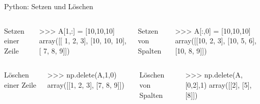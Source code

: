 \documentclass[hyperref={xetex}]{beamer}
\begin{document}
%
%
\begin{frame}[fragile]{Python: Setzen und Löschen}
\begin{columns}[c]%
%
\end{columns}%
\begin{columns}[t]
%
Setzen einer Zeile
\begin{pyin}
>>> A[1,:] = [10,10,10]
array([[ 1,  2,  3],
       [10, 10, 10],
       [ 7,  8,  9]])
\end{pyin}
%
Setzen von Spalten
\begin{pyin}
>>> A[:,0] = [10,10,10]
array([[10,  2,  3],
       [10,  5,  6],
       [10,  8,  9]])
\end{pyin}
\end{columns}
\begin{columns}[c]%
%
\end{columns}%
\begin{columns}[t]
%
Löschen einer Zeile
\begin{pyin}
>>> np.delete(A,1,0)
array([[1, 2, 3],
       [7, 8, 9]])
\end{pyin}
%
Löschen von Spalten
\begin{pyin}
>>> np.delete(A,[0,2],1)
array([[2],
       [5],
       [8]])
\end{pyin}
\end{columns}
\end{frame}
\end{document}
